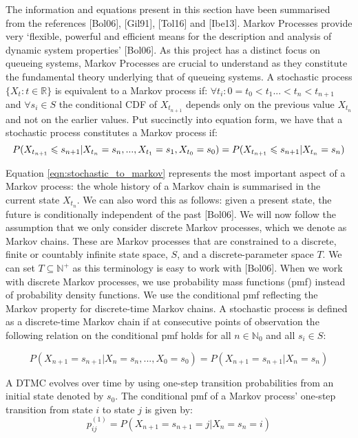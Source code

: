 \documentclass[a4paper,11pt,titlepage]{article}
\begin{document}
The information and equations present in this section have been summarised from the references [Bol06], [Gil91], [Tol16] and [Ibe13]. Markov Processes provide very `flexible, powerful and efficient means for the description and analysis of dynamic system properties' [Bol06]. As this project has a distinct focus on queueing systems, Markov Processes are crucial to understand as they constitute the fundamental theory underlying that of queueing systems. A stochastic process $\{X_t : t \in \mathbb{R}\}$ is equivalent to a Markov process if: $ \forall t_i: 0 = t_0 < t_1...< t_n < t_{n+1}$ and $ \forall s_i \in S$ the conditional CDF of $X_{t_{n+1}}$ depends only on the previous value $X_{t_{n}}$ and not on the earlier values. Put succinctly into equation form, we have that a stochastic process constitutes a Markov process if: 
\begin{equation}
    P(X_{t_{n+1}} \leqslant s_{n+1} | X_{t_{n}} = s_n,..., X_{t_{1}} = s_1, X_{t_{0}} = s_0) \\
    = P(X_{t_{n+1}} \leqslant s_{n+1} | X_{t_{n}} = s_n)
    \label{eqn:stochastic_to_markov}
\end{equation}

Equation \ref{eqn:stochastic_to_markov} represents the most important aspect of a Markov process: the whole history of a Markov chain is summarised in the current state $X_{t_n}$. We can also word this as follows: given a present state, the future is conditionally independent of the past [Bol06]. We will now follow the assumption that we only consider discrete Markov processes, which we denote as Markov chains. These are Markov processes that are constrained to a discrete, finite or countably infinite state space, $S$, and a discrete-parameter space $T$. We can set $T \subseteq \mathbb{N^+}$ as this terminology is easy to work with [Bol06]. When we work with discrete Markov processes, we use probability mass functions (pmf) instead of probability density functions. We use the conditional pmf reflecting the Markov property for discrete-time Markov chains. A stochastic process is defined as a discrete-time Markov chain if at consecutive points of observation the following relation on the conditional pmf holds for all $n \in \mathbb{N}_0$ and all $s_i \in S$: 

\begin{equation}
P(X_{n+1}=s_{n+1}|X_n=s_n,...,X_0=s_0) = P(X_{n+1}=s_{n+1}|X_n=s_n)
\end{equation}

A DTMC evolves over time by using one-step transition probabilities from an initial state denoted by $s_0$. The conditional pmf of a Markov process' one-step transition from state $i$ to state $j$ is given by: \begin{equation}
    p_{ij}^{(1)} = P(X_{n+1}=s_{n+1}=j|X_n=s_n=i)
\end{equation}
\end{document}
